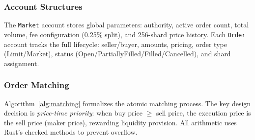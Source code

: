 \documentclass[conference]{IEEEtran}
\begin{document}
\subsubsection{Account Structures}
The \texttt{Market} account stores global parameters: authority, active order count, total volume, fee configuration (0.25\% split), and 256-shard price history. Each \texttt{Order} account tracks the full lifecycle: seller/buyer, amounts, pricing, order type (Limit/Market), status (Open/PartiallyFilled/Filled/Cancelled), and shard assignment.

\subsubsection{Order Matching}
Algorithm~\ref{alg:matching} formalizes the atomic matching process. The key design decision is \textit{price-time priority}: when buy price $\geq$ sell price, the execution price is the sell price (maker price), rewarding liquidity provision. All arithmetic uses Rust's checked methods to prevent overflow.
\end{document}
